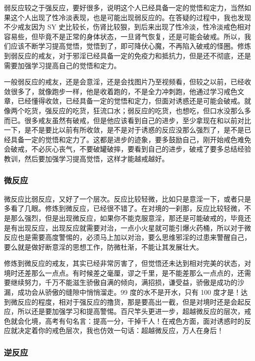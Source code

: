 弱反应较之于强反应，要好很多，说明这个人已经具备一定的觉悟和定力，当然如果这个人出现了性冷淡表现，也是可能出现弱反应的。在答疑的过程中，我也发现不少戒友因为 SY 史比较长，伤肾比较狠，到后来出现了性冷淡，性冷淡戒色相对容易些，但毕竟不是正常的身体状态，一旦肾气恢复，还是可能会破戒。所以，我们应该不断学习提高觉悟，觉悟到了，即可降伏心魔，不再陷入破戒的怪圈。修炼到弱反应的戒友，对于邪淫已经具备一定的免疫力和抵抗力，但是还不彻底，还是需要加强学习提高自己的觉悟和定力。

一般弱反应的戒友，还是会意淫，还是会找图片乃至视频看，但较之以前，已经收敛很多了，就像跑步一样，他是收着跑的，不是全力冲刺跑，他通过学习戒色文章，已经懂得收敛，已经具备一定的觉悟和定力，但面对诱惑还是可能会破戒。就像两个吃货，强反应的吃货，狂流口水；弱反应的吃货，也想吃，但口水没那么多而已。很多戒友虽然有破戒，但是他应该看到自己的进步，至少拿现在和以前对比一下，是不是要比以前有所收敛，是不是对于诱惑的反应没那么强烈了，是不是已经具备一定的觉悟和定力了。这都是进步的迹象，要多鼓励自己，刚开始戒色难免会破戒，不必灰心丧气，不要破罐破摔，要看到自己的进步，破戒了要多总结经验教训，然后要加强学习提高觉悟，这样才能越戒越好。

\subsubsection{微反应}

微反应比弱反应，又好了一个层次。反应比较轻微，比如只是意淫一下，或者只是多看了几眼。修炼到微反应，已经很不错了。在对境的一刹那，反应比较轻微，不是那么强烈，但是出现微反应，如果你不能克服意淫，那还是可能破戒的，毕竟还是有出现反应，出现反应就需要对治，一点小火星就可能引爆火药桶，所以对于微反应也是需要高度警惕的，必须马上加以对治，要么思维邪淫的过患来警醒自己，要么就是做好断意淫的思想工作，防微杜渐，不能让其发展壮大。

修炼到微反应的戒友，其实已经非常厉害了，但觉悟还未达到相对完美的状态，对境时还差那么一点点。有时候差之毫厘，谬之千里，是不能差那么一点点的，还需要继续努力，千万不能滋生骄傲自满的倾向，满招损，谦受益，骄傲是成功的沙漏，成功会从骄傲的缝隙中悄悄溜走。99 度的水不是开水，只有 100 度才是！达到微反应的程度，相对于强反应的撸货，那是要高出一截，但是对境时还是会起反应，所以还是要加强学习和提高警惕。百尺竿头更进一步，超越微反应的层次，戒色就会化境，高考有句名言：提高一分，干掉千人！在戒色方面，面对诱惑时的反应就决定着你的戒色层次，我也仿效一句话：超越微反应，万人在身后！

\subsubsection{逆反应}

